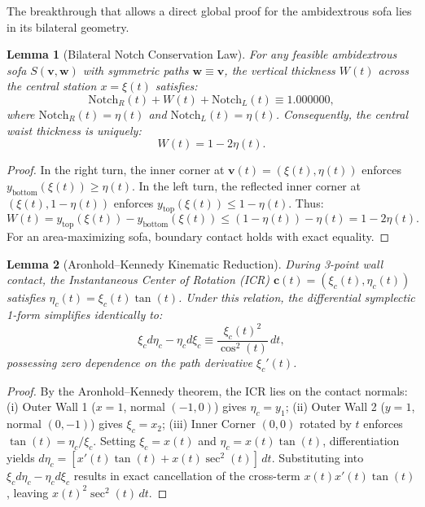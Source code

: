 \documentclass[11pt]{article}
\newtheorem{lemma}{Lemma}
\newcommand{\vpath}{\mathbf{v}}
\newcommand{\wpath}{\mathbf{w}}
\begin{document}
The breakthrough that allows a direct global proof for the ambidextrous sofa lies in its bilateral geometry.

\begin{lemma}[Bilateral Notch Conservation Law]
For any feasible ambidextrous sofa $S(\vpath, \wpath)$ with symmetric paths $\wpath \equiv \vpath$, the vertical thickness $W(t)$ across the central station $x = \xi(t)$ satisfies:
\begin{equation}
\text{Notch}_R(t) + W(t) + \text{Notch}_L(t) \equiv 1.000000,
\end{equation}
where $\text{Notch}_R(t) = \eta(t)$ and $\text{Notch}_L(t) = \eta(t)$. Consequently, the central waist thickness is uniquely:
\begin{equation}
W(t) = 1 - 2\eta(t).
\end{equation}
\end{lemma}

\begin{proof}
In the right turn, the inner corner at $\vpath(t) = (\xi(t), \eta(t))$ enforces $y_{\text{bottom}}(\xi(t)) \ge \eta(t)$. In the left turn, the reflected inner corner at $(\xi(t), 1 - \eta(t))$ enforces $y_{\text{top}}(\xi(t)) \le 1 - \eta(t)$. Thus:
\[
W(t) = y_{\text{top}}(\xi(t)) - y_{\text{bottom}}(\xi(t)) \le (1 - \eta(t)) - \eta(t) = 1 - 2\eta(t).
\]
For an area-maximizing sofa, boundary contact holds with exact equality.
\end{proof}

\begin{lemma}[Aronhold--Kennedy Kinematic Reduction]
During 3-point wall contact, the Instantaneous Center of Rotation (ICR) $\mathbf{c}(t) = (\xi_c(t), \eta_c(t))$ satisfies $\eta_c(t) = \xi_c(t)\tan(t)$. Under this relation, the differential symplectic 1-form simplifies identically to:
\begin{equation}
\xi_c d\eta_c - \eta_c d\xi_c \equiv \frac{\xi_c(t)^2}{\cos^2(t)}\,dt,
\end{equation}
possessing zero dependence on the path derivative $\xi_c'(t)$.
\end{lemma}

\begin{proof}
By the Aronhold--Kennedy theorem, the ICR lies on the contact normals:
(i) Outer Wall 1 ($x=1$, normal $(-1, 0)$) gives $\eta_c = y_1$;
(ii) Outer Wall 2 ($y=1$, normal $(0, -1)$) gives $\xi_c = x_2$;
(iii) Inner Corner $(0, 0)$ rotated by $t$ enforces $\tan(t) = \eta_c / \xi_c$.
Setting $\xi_c = x(t)$ and $\eta_c = x(t)\tan(t)$, differentiation yields $d\eta_c = [x'(t)\tan(t) + x(t)\sec^2(t)]\,dt$. Substituting into $\xi_c d\eta_c - \eta_c d\xi_c$ results in exact cancellation of the cross-term $x(t)x'(t)\tan(t)$, leaving $x(t)^2\sec^2(t)\,dt$.
\end{proof}
\end{document}
